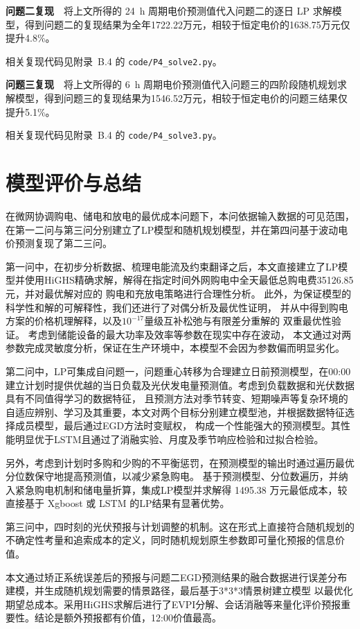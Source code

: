 \documentclass[zihao=-4,a4paper,fontset=none]{ctexart}
\begin{document}
\textbf{问题二复现}\ \ 将上文所得的 24~h 周期电价预测值代入问题二的逐日 LP 求解模型，得到问题二的复现结果为全年1722.22万元，相较于恒定电价的1638.75万元仅提升4.8\%。

相关复现代码见附录~B.4 的 \texttt{code/P4\_solve2.py}。

\textbf{问题三复现}\ \ 将上文所得的 6~h 周期电价预测值代入问题三的四阶段随机规划求解模型，得到问题三的复现结果为1546.52万元，相较于恒定电价的问题三结果仅提升5.1\%。

相关复现代码见附录~B.4 的 \texttt{code/P4\_solve3.py}。


\section{模型评价与总结}

在微网协调购电、储电和放电的最优成本问题下，本问依据输入数据的可见范围，在第一二问与第三问分别建立了LP模型和随机规划模型，并在第四问基于波动电价预测复现了第二三问。

第一问中，在初步分析数据、梳理电能流及约束翻译之后，本文直接建立了LP模型并使用HiGHS精确求解，解得在指定时间外网购电中全天最低总购电费35126.85元，并对最优解对应的
购电和充放电策略进行合理性分析。
此外，为保证模型的科学性和解的可解释性，我们还进行了对偶分析及最优性证明，
并从中得到购电方案的价格机理解释，以及$10^{-17}$量级互补松弛与有限差分重解的
双重最优性验证。
考虑到储能设备的最大功率及效率等参数在现实中存在波动，
本文通过对两参数完成灵敏度分析，保证在生产环境中，本模型不会因为参数偏而明显劣化。

第二问中，LP可集成自问题一，问题重心转移为合理建立日前预测模型，在00:00建立计划时提供优越的当日负载及光伏发电量预测值。考虑到负载数据和光伏数据具有不同值得学习的数据特征，
且预测方法对季节转变、短期噪声等复杂环境的自适应辨别、学习及其重要，本文对两个目标分别建立模型池，并根据数据特征选择成员模型，最后通过EGD方法时变赋权，
构成一个性能强大的预测模型。其性能明显优于LSTM且通过了消融实验、月度及季节响应检验和过拟合检验。

另外，考虑到计划时多购和少购的不平衡惩罚，在预测模型的输出时通过遍历最优分位数保守地提高预测值，以减少紧急购电。
基于预测模型、分位数遍历，并纳入紧急购电机制和储电量折算，集成LP模型并求解得 1495.38 万元最低成本，较直接基于 Xgboost 或 LSTM 的LP结果有显著优势。

第三问中，四时刻的光伏预报与计划调整的机制。这在形式上直接符合随机规划的不确定性考量和追索成本的定义，同时随机规划原生参数即可量化预报的信息价值。

本文通过矫正系统误差后的预报与问题二EGD预测结果的融合数据进行误差分布建模，并生成随机规划需要的情景路径，最后基于3*3*3情景树建立模型
以最优化期望总成本。采用HiGHS求解后进行了EVPI分解、会话消融等来量化评价预报重要性。结论是额外预报都有价值，12:00价值最高。
\end{document}
